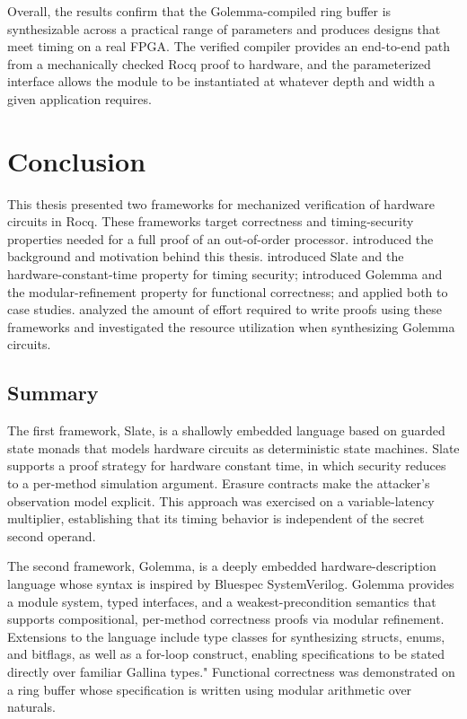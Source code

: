 \documentclass[fontset=fira-newtxsf]{mitthesis}
\theoremstyle{definition}
\theoremstyle{plain}
\begin{document}
Overall, the results confirm that the Golemma-compiled ring buffer is synthesizable across a practical range of parameters and produces designs that meet timing on a real FPGA.
The verified compiler provides an end-to-end path from a mechanically checked Rocq proof to hardware, and the parameterized interface allows the module to be instantiated at whatever depth and width a given application requires.

\chapter{Conclusion}

This thesis presented two frameworks for mechanized verification of hardware circuits in Rocq. These frameworks target correctness and timing-security properties needed for a full proof of an out-of-order processor.
 introduced the background and motivation behind this thesis.
 introduced Slate and the hardware-constant-time property for timing security;  introduced Golemma and the modular-refinement property for functional correctness; and  applied both to case studies.
 analyzed the amount of effort required to write proofs using these frameworks and investigated the resource utilization when synthesizing Golemma circuits.

\section{Summary}

The first framework, Slate, is a shallowly embedded language based on guarded state monads that models hardware circuits as deterministic state machines.
Slate supports a proof strategy for hardware constant time, in which security reduces to a per-method simulation argument.
Erasure contracts make the attacker's observation model explicit.
This approach was exercised on a variable-latency multiplier, establishing that its timing behavior is independent of the secret second operand.

The second framework, Golemma, is a deeply embedded hardware-description language whose syntax is inspired by Bluespec SystemVerilog.
Golemma provides a module system, typed interfaces, and a weakest-precondition semantics that supports compositional, per-method correctness proofs via modular refinement.
Extensions to the language include type classes for synthesizing structs, enums, and bitflags, as well as a for-loop construct, enabling specifications to be stated directly over familiar Gallina types."
Functional correctness was demonstrated on a ring buffer whose specification is written using modular arithmetic over naturals.
\end{document}
